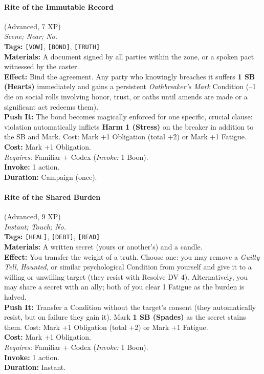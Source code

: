 \paragraph{Rite of the Immutable Record} (Advanced, 7 XP) \hfill \\
\emph{Scene; Near; No.} \\
\textbf{Tags:} \texttt{[VOW]}, \texttt{[BOND]}, \texttt{[TRUTH]} \\
\textbf{Materials:} A document signed by all parties within the zone, or a spoken pact witnessed by the caster. \\
\textbf{Effect:} Bind the agreement. Any party who knowingly breaches it suffers \textbf{1 SB (Hearts)} immediately and gains a persistent \textit{Oathbreaker's Mark} Condition (--1 die on social rolls involving honor, trust, or oaths until amends are made or a significant act redeems them). \\
\textbf{Push It:} The bond becomes magically enforced for one specific, crucial clause: violation automatically inflicts \textbf{Harm 1 (Stress)} on the breaker in addition to the SB and Mark. Cost: Mark +1 Obligation (total +2) or Mark +1 Fatigue. \\
\textbf{Cost:} Mark +1 Obligation. \\
\textit{Requires:} Familiar + Codex (\textit{Invoke:} 1 Boon). \\
\textbf{Invoke:} 1 action. \\
\textbf{Duration:} Campaign (once).

\paragraph{Rite of the Shared Burden} (Advanced, 9 XP) \hfill \\
\emph{Instant; Touch; No.} \\
\textbf{Tags:} \texttt{[HEAL]}, \texttt{[DEBT]}, \texttt{[READ]} \\
\textbf{Materials:} A written secret (yours or another's) and a candle. \\
\textbf{Effect:} You transfer the weight of a truth. Choose one: you may remove a \textit{Guilty Tell}, \textit{Haunted}, or similar psychological Condition from yourself and give it to a willing or unwilling target (they resist with Resolve DV 4). Alternatively, you may share a secret with an ally; both of you clear 1 Fatigue as the burden is halved. \\
\textbf{Push It:} Transfer a Condition without the target's consent (they automatically resist, but on failure they gain it). Mark \textbf{1 SB (Spades)} as the secret stains them. Cost: Mark +1 Obligation (total +2) or Mark +1 Fatigue. \\
\textbf{Cost:} Mark +1 Obligation. \\
\textit{Requires:} Familiar + Codex (\textit{Invoke:} 1 Boon). \\
\textbf{Invoke:} 1 action. \\
\textbf{Duration:} Instant.

